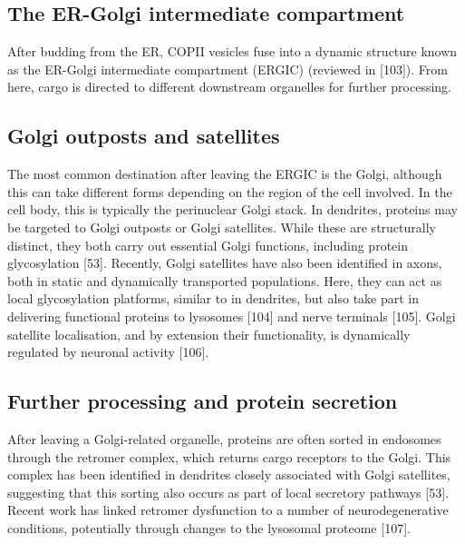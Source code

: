 \documentclass[
  12pt,
  a4paper,
]{book}
\begin{document}
\hypertarget{the-er-golgi-intermediate-compartment}{%
\subsection{The ER-Golgi intermediate compartment}\label{the-er-golgi-intermediate-compartment}}

After budding from the ER, COPII vesicles fuse into a dynamic structure known as the ER-Golgi intermediate compartment (ERGIC) (reviewed in {[}103{]}). From here, cargo is directed to different downstream organelles for further processing.

\hypertarget{golgi-outposts-and-satellites}{%
\subsection{Golgi outposts and satellites}\label{golgi-outposts-and-satellites}}

The most common destination after leaving the ERGIC is the Golgi, although this can take different forms depending on the region of the cell involved. In the cell body, this is typically the perinuclear Golgi stack. In dendrites, proteins may be targeted to Golgi outposts or Golgi satellites. While these are structurally distinct, they both carry out essential Golgi functions, including protein glycosylation {[}53{]}. Recently, Golgi satellites have also been identified in axons, both in static and dynamically transported populations. Here, they can act as local glycosylation platforms, similar to in dendrites, but also take part in delivering functional proteins to lysosomes {[}104{]} and nerve terminals {[}105{]}. Golgi satellite localisation, and by extension their functionality, is dynamically regulated by neuronal activity {[}106{]}.

\hypertarget{further-processing-and-protein-secretion}{%
\subsection{Further processing and protein secretion}\label{further-processing-and-protein-secretion}}

After leaving a Golgi-related organelle, proteins are often sorted in endosomes through the retromer complex, which returns cargo receptors to the Golgi. This complex has been identified in dendrites closely associated with Golgi satellites, suggesting that this sorting also occurs as part of local secretory pathways {[}53{]}. Recent work has linked retromer dysfunction to a number of neurodegenerative conditions, potentially through changes to the lysosomal proteome {[}107{]}.
\end{document}
